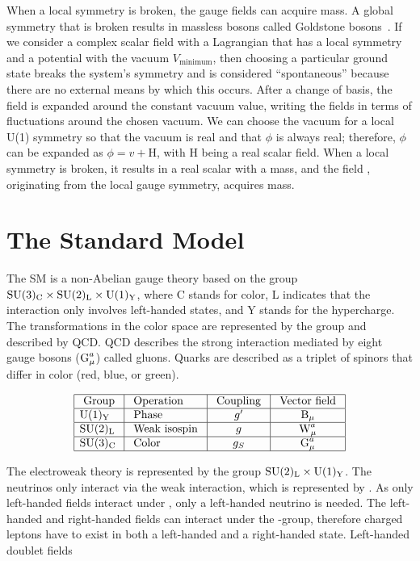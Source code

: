 When a local symmetry is broken, the gauge fields can acquire mass. A global symmetry that is broken results in massless bosons called Goldstone bosons~\cite{Goldstone:1961eq, Goldstone:1962es}. If we consider a complex scalar field with a Lagrangian that has a local \uone symmetry and a potential with the vacuum $V_{\text{minimum}}$, then choosing a particular ground state breaks the system's symmetry and is considered ``spontaneous'' because there are no external means by which this occurs. After a change of basis, the field is expanded around the constant vacuum value, writing the fields in terms of fluctuations around the chosen vacuum. We can choose the vacuum for a local U(1) symmetry so that the vacuum is real and that $\phi$ is always real; therefore, $\phi$ can be expanded as $\phi = v + \text{H}$, with H being a real scalar field. When a local \uone symmetry is broken, it results in a real scalar with a mass, and the field \amu, originating from the local gauge symmetry, acquires mass.


\section{The Standard Model}
The SM is a non-Abelian gauge theory based on the group $\text{SU}(3)_{\text{C}} \times \text{SU}(2)_{\text{L}} \times \text{U}(1)_{\text{Y}}$, where C stands for color, L indicates that the interaction only involves left-handed states, and Y stands for the hypercharge. The transformations in the color space are represented by the group \col and described by QCD. QCD describes the strong interaction mediated by eight gauge bosons ($\text{G}_{\mu}^{a}$) called gluons. Quarks are described as a triplet of spinors that differ in color (red, blue, or green).

\begin{equation}
  \begin{array}{|l|l|c|c|}
    \hline \text { Group } & \text { Operation } & \text { Coupling } & \text { Vector field } \\
    \hline \text{U}(1)_{\text{Y}} & \text { Phase } & g^{\prime} & \text{B}_{\mu} \\
    \hline \text{SU}(2)_{\text{L}} & \text { Weak isospin } & g & \text{W}_{\mu}^{a} \\
    \hline \text{SU}(3)_{\text{C}} & \text { Color } & g_{S} & \text{G}_{\mu}^{a} \\
    \hline
  \end{array}
  \label{tab:group}
\end{equation}

The electroweak theory is represented by the group $\text{SU}(2)_{\text{L}} \times \text{U}(1)_{\text{Y}}$. The neutrinos only interact via the weak interaction, which is represented by \iso. As only left-handed fields interact under \iso, only a left-handed neutrino is needed. The left-handed and right-handed fields can interact under the \hyp group, therefore charged leptons have to exist in both a left-handed and a right-handed state. Left-handed doublet fields

